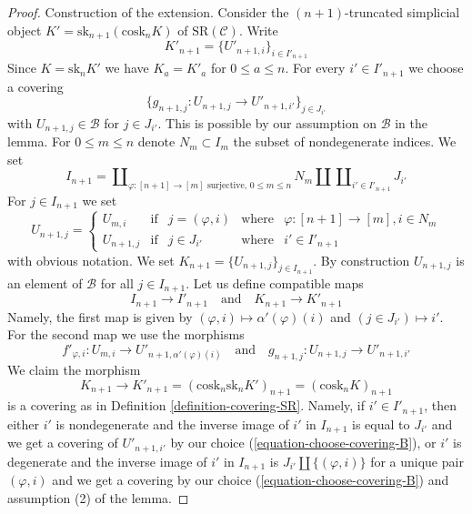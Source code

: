 \documentclass{stacks-project}
\theoremstyle{plain}
\theoremstyle{definition}
\theoremstyle{remark}
\numberwithin{equation}{subsection}
\begin{document}
\begin{proof}
\medskip\noindent
Construction of the extension. Consider the $(n + 1)$-truncated simplicial
object $K' = \text{sk}_{n + 1}(\text{cosk}_n K)$ of $\text{SR}(\mathcal{C})$.
Write
$$
K'_{n + 1} = \{U'_{n + 1, i}\}_{i \in I'_{n + 1}}
$$
Since $K = \text{sk}_n K'$ we have $K_a = K'_a$ for $0 \leq a \leq n$.
For every $i' \in I'_{n + 1}$ we choose a covering
\begin{equation}
\label{equation-choose-covering-B}
\{g_{n + 1, j} : U_{n + 1, j} \to U'_{n + 1, i'}\}_{j \in J_{i'}}
\end{equation}
with $U_{n + 1, j} \in \mathcal{B}$ for $j \in J_{i'}$.
This is possible by our assumption on $\mathcal{B}$ in the lemma.
For $0 \leq m \leq n$ denote $N_m \subset I_m$ the subset of
nondegenerate indices. We set
$$
I_{n + 1} =
\coprod\nolimits_{\varphi : [n + 1] \to [m]\text{ surjective, }0\leq m \leq n}
N_m \amalg
\coprod\nolimits_{i' \in I'_{n + 1}} J_{i'}
$$
For $j \in I_{n + 1}$ we set
$$
U_{n + 1, j} =
\left\{
\begin{matrix}
U_{m, i} & \text{if} &
j = (\varphi, i) & \text{where} & \varphi : [n + 1] \to [m], i \in N_m \\
U_{n + 1, j} & \text{if} &
j \in J_{i'} & \text{where} & i' \in I'_{n + 1}
\end{matrix}
\right.
$$
with obvious notation. We set $K_{n + 1} = \{U_{n + 1, j}\}_{j \in I_{n + 1}}$.
By construction $U_{n + 1, j}$ is an element
of $\mathcal{B}$ for all $j \in I_{n + 1}$. Let us define compatible
maps
$$
I_{n + 1} \to I'_{n + 1}
\quad\text{and}\quad
K_{n + 1} \to K'_{n + 1}
$$
Namely, the first map is given by
$(\varphi, i) \mapsto \alpha'(\varphi)(i)$ and
$(j \in J_{i'}) \mapsto i'$.
For the second map we use the morphisms
$$
f'_{\varphi, i} : U_{m, i} \to U'_{n + 1, \alpha'(\varphi)(i)}
\quad\text{and}\quad
g_{n + 1, j} : U_{n + 1, j} \to U'_{n + 1, i'}
$$
We claim the morphism
$$
K_{n + 1} \to K'_{n + 1} =
(\text{cosk}_n \text{sk}_n K')_{n + 1} =
(\text{cosk}_n K)_{n + 1}
$$
is a covering as in Definition \ref{definition-covering-SR}.
Namely, if $i' \in I'_{n + 1}$, then either $i'$ is nondegenerate
and the inverse image of $i'$ in $I_{n + 1}$ is equal to $J_{i'}$
and we get a covering of $U'_{n + 1, i'}$ by our choice
(\ref{equation-choose-covering-B}), or $i'$ is degenerate and
the inverse image of $i'$ in $I_{n + 1}$ is
$J_{i'} \amalg \{(\varphi, i)\}$ for a unique pair $(\varphi, i)$
and we get a covering by our choice (\ref{equation-choose-covering-B})
and assumption (2) of the lemma.


\end{proof}
\end{document}
